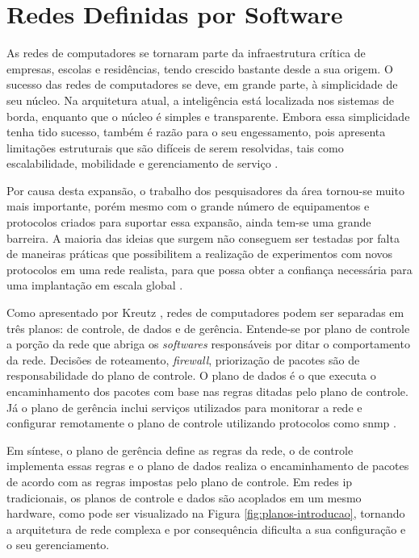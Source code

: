 \section{Redes Definidas por Software}
\label{sec:sdn-openflow}

As redes de computadores se tornaram parte da infraestrutura crítica de empresas, escolas e residências, tendo crescido bastante desde a sua origem. O sucesso das redes de computadores se deve, em grande parte, à simplicidade de seu núcleo. Na arquitetura atual, a inteligência está localizada nos sistemas de borda, enquanto que o núcleo é simples e transparente. Embora essa simplicidade tenha tido sucesso, também é razão para o seu engessamento, pois apresenta limitações estruturais que são difíceis de serem resolvidas, tais como escalabilidade, mobilidade e gerenciamento de serviço \cite{Clarkl:2004}.

Por causa desta expansão, o trabalho dos pesquisadores da área tornou-se muito mais importante, porém mesmo com o grande número de equipamentos e protocolos criados para suportar essa expansão, ainda tem-se uma grande barreira. A maioria das ideias que surgem não conseguem ser testadas por falta de maneiras práticas que possibilitem a realização de experimentos com novos protocolos em uma rede realista, para que possa obter a confiança necessária para uma implantação em escala global \cite{McKeown:2008}. 

Como apresentado por Kreutz \cite{Kreutz:2014}, redes de computadores podem ser separadas em três planos: de controle, de dados e de gerência. Entende-se por plano de controle a porção da rede que abriga os \textit{softwares} responsáveis por ditar o comportamento da rede. Decisões de roteamento, \textit{firewall}, priorização de pacotes são de responsabilidade do plano de controle. O plano de dados é o que executa o encaminhamento dos pacotes com base nas regras ditadas pelo plano de controle. Já o plano de gerência inclui serviços utilizados para monitorar a rede e configurar remotamente o plano de controle utilizando protocolos como \gls{snmp} \cite{RFC1157}. 

Em síntese, o plano de gerência define as regras da rede, o de controle implementa essas regras e o plano de dados realiza o encaminhamento de pacotes de acordo com as regras impostas pelo plano de controle. Em redes \gls{ip} tradicionais, os planos de controle e dados são acoplados em um mesmo hardware, como pode ser visualizado na Figura \ref{fig:planos-introducao}, tornando a arquitetura de rede complexa e por consequência dificulta a sua configuração e o seu gerenciamento.


